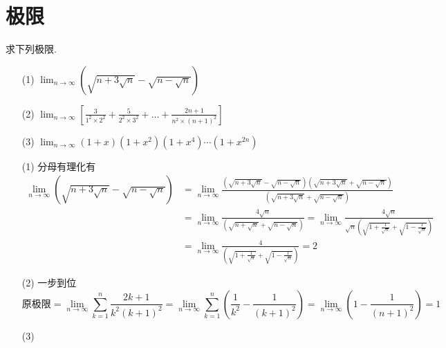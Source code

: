 \section{极限}
\begin{xiti}
\item 求下列极限.
\begin{enumerate}
	\item[(1)] $\lim _ { n \rightarrow \infty } ( \sqrt { n + 3 \sqrt { n } } - \sqrt { n - \sqrt { n } } )$
	\item[(2)] $\lim _ { n \rightarrow \infty } \left[ \frac { 3 } { 1 ^ { 2 } \times 2 ^ { 2 } } + \frac { 5 } { 2 ^ { 2 } \times 3 ^ { 2 } } + \dots + \frac { 2 n + 1 } { n ^ { 2 } \times ( n + 1 ) ^ { 2 } } \right]$
	\item[(3)] $\lim _ { n \rightarrow \infty } ( 1 + x ) \left( 1 + x ^ { 2 } \right) \left( 1 + x ^ { 4 } \right) \cdots \left( 1 + x ^ { 2 n } \right)$
\end{enumerate}
\begin{solution}
	\begin{enumerate}
		\item[(1)] 分母有理化有
		\begin{align*}
		\lim_{n\rightarrow\infty}\left(\sqrt{n+3\sqrt{n}}-\sqrt{n-\sqrt{n}}\right)&=\lim_{n\rightarrow\infty}\frac{\left(\sqrt{n+3\sqrt{n}}-\sqrt{n-\sqrt{n}}\right)\left(\sqrt{n+3\sqrt{n}}+\sqrt{n-\sqrt{n}}\right)}{\left(\sqrt{n+3\sqrt{n}}+\sqrt{n-\sqrt{n}}\right)}\\
		&=\lim_{n\rightarrow\infty}\frac{4\sqrt{n}}{\left(\sqrt{n+\sqrt{n}}+\sqrt{n-\sqrt{n}}\right)}=\lim_{n\rightarrow\infty}\frac{4\sqrt{n}}{\sqrt{n}\left(\sqrt{1+\frac{1}{\sqrt{n}}}+\sqrt{1-\frac{1}{\sqrt{n}}}\right)}\\
		&=\lim_{n\rightarrow\infty}\frac{4}{\left(\sqrt{1+\frac{1}{\sqrt{n}}}+\sqrt{1-\frac{1}{\sqrt{n}}}\right)}=2
		\end{align*}
		\item[(2)] 一步到位
		\[
		\textrm{原极限}=\lim_{n\rightarrow\infty}\sum_{k=1}^n{\frac{2k+1}{k^2\left(k+1\right)^2}}=\lim_{n\rightarrow\infty}\sum_{k=1}^n{\left(\frac{1}{k^2}-\frac{1}{\left(k+1\right)^2}\right)}=\lim_{n\rightarrow\infty}\left(1-\frac{1}{\left(n+1\right)^2}\right)=1
		\]
		\item[(3)] 
	\end{enumerate}
	

\end{solution}
\end{xiti}
